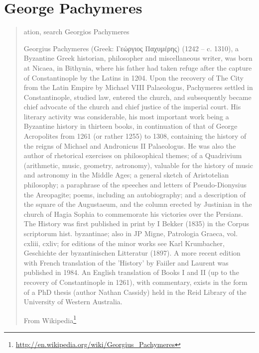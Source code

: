 \documentclass[12pt,letterpaper,twoside,final]{memoir}
\begin{document}
\section{George Pachymeres}
\blockquote[From Wikipedia\footnote{\url{http://en.wikipedia.org/wiki/Georgius_Pachymeres}}]{ation, search
Georgios Pachymeres

Georgius Pachymeres (Greek: Γεώργιος Παχυμέρης) (1242 – c. 1310), a Byzantine Greek historian, philosopher and miscellaneous writer, was born at Nicaea, in Bithynia, where his father had taken refuge after the capture of Constantinople by the Latins in 1204. Upon the recovery of The City from the Latin Empire by Michael VIII Palaeologus, Pachymeres settled in Constantinople, studied law, entered the church, and subsequently became chief advocate of the church and chief justice of the imperial court. His literary activity was considerable, his most important work being a Byzantine history in thirteen books, in continuation of that of George Acropolites from 1261 (or rather 1255) to 1308, containing the history of the reigns of Michael and Andronicus II Palaeologus. He was also the author of rhetorical exercises on philosophical themes; of a Quadrivium (arithmetic, music, geometry, astronomy), valuable for the history of music and astronomy in the Middle Ages; a general sketch of Aristotelian philosophy; a paraphrase of the speeches and letters of Pseudo-Dionysius the Areopagite; poems, including an autobiography; and a description of the square of the Augustaeum, and the column erected by Justinian in the church of Hagia Sophia to commemorate his victories over the Persians. The History was first published in print by I Bekker (1835) in the Corpus scriptorum hist. byzantinae; also in JP Migne, Patrologia Graeca, vol. cxliii, cxliv; for editions of the minor works see Karl Krumbacher, Geschichte der byzantinischen Litteratur (1897). A more recent edition with French translation of the 'History' by Faiiler and Laurent was published in 1984. An English translation of Books I and II (up to the recovery of Constantinople in 1261), with commentary, exists in the form of a PhD thesis (author Nathan Cassidy) held in the Reid Library of the University of Western Australia.}
\end{document}
